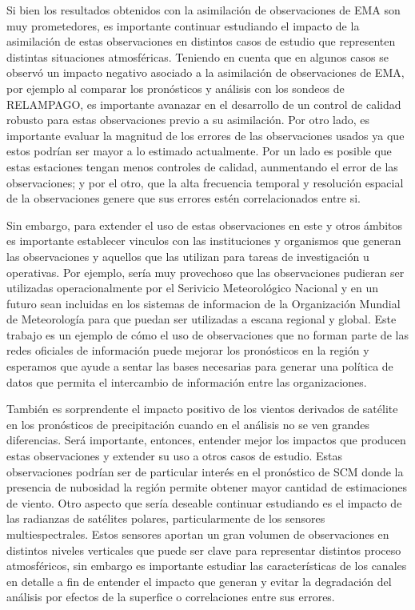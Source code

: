 \documentclass[12pt,oneside,a4paper]{reedthesis}
\begin{document}
Si bien los resultados obtenidos con la asimilación de observaciones de EMA son muy prometedores, es importante continuar estudiando el impacto de la asimilación de estas observaciones en distintos casos de estudio que representen distintas situaciones atmosféricas. Teniendo en cuenta que en algunos casos se observó un impacto negativo asociado a la asimilación de observaciones de EMA, por ejemplo al comparar los pronósticos y análisis con los sondeos de RELAMPAGO, es importante avanazar en el desarrollo de un control de calidad robusto para estas observaciones previo a su asimilación. Por otro lado, es importante evaluar la magnitud de los errores de las observaciones usados ya que estos podrían ser mayor a lo estimado actualmente. Por un lado es posible que estas estaciones tengan menos controles de calidad, aunmentando el error de las observaciones; y por el otro, que la alta frecuencia temporal y resolución espacial de la observaciones genere que sus errores estén correlacionados entre si.

Sin embargo, para extender el uso de estas observaciones en este y otros ámbitos es importante establecer vinculos con las instituciones y organismos que generan las observaciones y aquellos que las utilizan para tareas de investigación u operativas. Por ejemplo, sería muy provechoso que las observaciones pudieran ser utilizadas operacionalmente por el Serivicio Meteorológico Nacional y en un futuro sean incluidas en los sistemas de informacion de la Organización Mundial de Meteorología para que puedan ser utilizadas a escana regional y global. Este trabajo es un ejemplo de cómo el uso de observaciones que no forman parte de las redes oficiales de información puede mejorar los pronósticos en la región y esperamos que ayude a sentar las bases necesarias para generar una política de datos que permita el intercambio de información entre las organizaciones.

También es sorprendente el impacto positivo de los vientos derivados de satélite en los pronósticos de precipitación cuando en el análisis no se ven grandes diferencias. Será importante, entonces, entender mejor los impactos que producen estas observaciones y extender su uso a otros casos de estudio. Estas observaciones podrían ser de particular interés en el pronóstico de SCM donde la presencia de nubosidad la región permite obtener mayor cantidad de estimaciones de viento. Otro aspecto que sería deseable continuar estudiando es el impacto de las radianzas de satélites polares, particularmente de los sensores multiespectrales. Estos sensores aportan un gran volumen de observaciones en distintos niveles verticales que puede ser clave para representar distintos proceso atmosféricos, sin embargo es importante estudiar las características de los canales en detalle a fin de entender el impacto que generan y evitar la degradación del análisis por efectos de la superfice o correlaciones entre sus errores.
\end{document}
